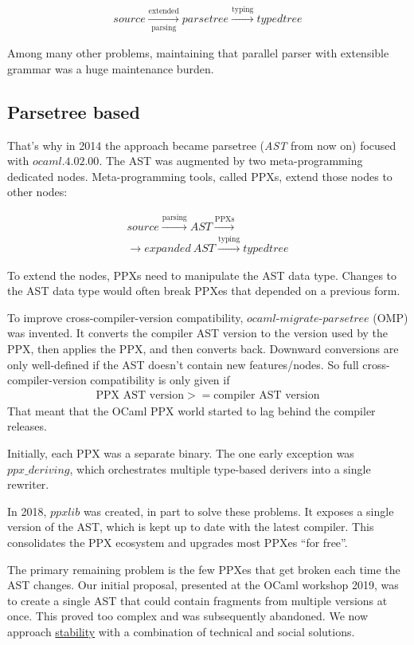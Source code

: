 \documentclass[10pt, a4paper, twocolumn]{article}
\begin{document}
\begin{align*}
source \xrightarrow[\text{parsing}]{\text{extended}} parsetree \xrightarrow{\text{typing}} typedtree
\end{align*}

Among many other problems, maintaining that parallel parser with extensible
grammar was a huge maintenance burden.


\subsection{Parsetree based}

That's why in 2014 the approach became parsetree (\emph{AST} from now on)
focused with $ocaml.4.02.00$. The AST was augmented by two meta-programming
dedicated nodes. Meta-programming tools, called PPXs, extend those nodes to
other nodes:

\begin{gather*}
source \xrightarrow{\text{parsing}} AST \xrightarrow{\text{PPXs}}\\
\rightarrow expanded\ AST\xrightarrow{\text{typing}} typedtree
\end{gather*}

To extend the nodes, PPXs need to manipulate the AST data type. Changes to the
AST data type would often break PPXes that depended on a previous form.

To improve cross-compiler-version compatibility,
$ocaml\mbox{-}migrate\mbox{-}parsetree$ (OMP) was invented. It converts the
compiler AST version to the version used by the PPX, then applies the PPX, and
then converts back. Downward conversions are only well-defined if the AST
doesn't contain new features/nodes. So full cross-compiler-version compatibility
is only given if
\begin{align*}
\text{PPX\ AST\ version} >= \text{compiler\ AST\ version}
\end{align*}
That meant that the OCaml PPX world started to lag behind the compiler releases.

Initially, each PPX was a separate binary. The one early exception was $ppx \_
deriving$, which orchestrates multiple type-based derivers into a single
rewriter.

In 2018, $ppxlib$ was created, in part to solve these problems. It exposes a
single version of the AST, which is kept up to date with the latest compiler.
This consolidates the PPX ecosystem and upgrades most PPXes ``for free''.

The primary remaining problem is the few PPXes that get broken each time the AST
changes. Our initial proposal, presented at the OCaml workshop 2019, was to
create a single AST that could contain fragments from multiple versions at once.
This proved too complex and was subsequently abandoned. We now
approach \hyperref[stability]{stability} with a combination of technical and
social solutions.
\end{document}
